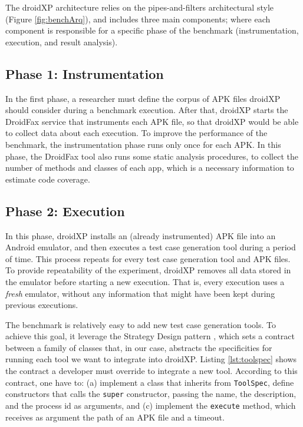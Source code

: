 The droidXP architecture relies on the pipes-and-filters architectural style \cite{architecture-book} (Figure \ref{fig:benchArq}),
and includes three main components; where each component is responsible for a specific phase of the
benchmark (instrumentation, execution, and result analysis).

\subsection{Phase 1: Instrumentation}

In the first phase, a researcher must define the corpus of APK files droidXP
should consider during a benchmark execution. After that, droidXP starts the DroidFax service that instruments each APK file, so that droidXP would be able to collect data about each execution. To improve the performance of the benchmark, the instrumentation phase runs only once for each APK. In this phase, the DroidFax tool also runs some static analysis procedures, to collect the number of methods and classes of each app, which is a necessary information to estimate code coverage.

\subsection{Phase 2: Execution}

In this phase, droidXP installs an (already instrumented) APK file into
an Android emulator, and then executes a test case generation tool
during a period of time. This process repeats for every test case generation
tool and APK files. To provide repeatability of the experiment,
droidXP removes all data stored in the emulator before starting
a new execution. That is, every execution uses a \emph{fresh} emulator,
without any information that might have been kept during
previous executions. 

The benchmark is relatively easy to add new test
case generation tools. To achieve this goal, it leverage the
Strategy Design pattern \cite{patterns-book}, which sets a contract between a family of classes that, in our case, abstracts the specificities for running each tool we want to integrate into droidXP. Listing \ref{lst:toolspec} shows the contract a developer must override to integrate a new tool. According to this contract, one have to: (a) implement a class that inherits from \texttt{ToolSpec}, define constructors that calls the \texttt{super} constructor, passing the name, the description, and the process id as arguments, and (c) implement the \texttt{execute} method, which receives as argument the path of an APK file and a timeout. 

